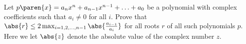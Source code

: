 Let $p\paren{x}=a_nx^n+a_{n-1}x^{n-1}+\ldots+a_0$ be a polynomial with complex coefficients such that $a_i\neq0$ for all $i$. Prove that $\abs{r}\leq2\max _{i=1,2,\ldots,n-1}\abs{\frac{a_{i-1}}{a_i}}$ for all roots $r$ of all such polynomials $p$. Here we let $\abs{z}$ denote the absolute value of the complex number $z$.